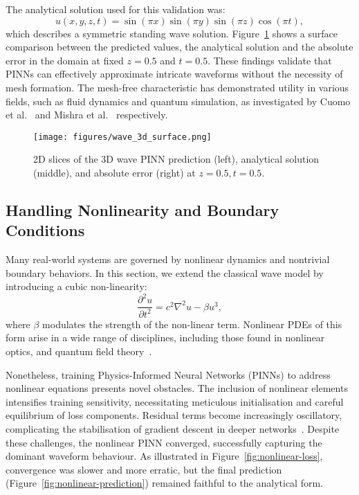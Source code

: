 \documentclass[12pt,a4paper]{article}
\begin{document}
The analytical solution used for this validation was:
\begin{equation}
u(x,y,z,t) = \sin(\pi x)\sin(\pi y)\sin(\pi z)\cos(\pi t),
\label{eq:wave-3d-analytic}
\end{equation}
which describes a symmetric standing wave solution. Figure~\ref{fig:wave3d-surfaces} shows a surface comparison between the predicted values, the analytical solution and the absolute error in the domain at fixed \(z = 0.5\) and \(t = 0.5\). These findings validate that PINNs can effectively approximate intricate waveforms without the necessity of mesh formation. The mesh-free characteristic has demonstrated utility in various fields, such as fluid dynamics and quantum simulation, as investigated by Cuomo et al.~\cite{cuomo2022scientific} and Mishra et al.~\cite{mishra2022estimates} respectively.

\begin{figure}[h!]
  \centering
  \texttt{[image: figures/wave\_3d\_surface.png]}
  \caption{2D slices of the 3D wave PINN prediction (left), analytical solution (middle), and absolute error (right) at \(z = 0.5, t = 0.5\).}
  \label{fig:wave3d-surfaces}
\end{figure}

\subsection{Handling Nonlinearity and Boundary Conditions}

Many real-world systems are governed by nonlinear dynamics and nontrivial boundary behaviors. In this section, we extend the classical wave model by introducing a cubic non-linearity:
\begin{equation}
\frac{\partial^2 u}{\partial t^2} = c^2 \nabla^2 u - \beta u^3,
\label{eq:nonlinear-wave}
\end{equation}
where \(\beta\) modulates the strength of the non-linear term. Nonlinear PDEs of this form arise in a wide range of disciplines, including those found in nonlinear optics, and quantum field theory~\cite{strauss2007partial, taylor2010partial}.

Nonetheless, training Physics-Informed Neural Networks (PINNs) to address nonlinear equations presents novel obstacles. The inclusion of nonlinear elements intensifies training sensitivity, necessitating meticulous initialisation and careful equilibrium of loss components. Residual terms become increasingly oscillatory, complicating the stabilisation of gradient descent in deeper networks~\cite{wang2022understanding}. Despite these challenges, the nonlinear PINN converged, successfully capturing the dominant waveform behaviour. As illustrated in Figure~\ref{fig:nonlinear-loss}, convergence was slower and more erratic, but the final prediction (Figure~\ref{fig:nonlinear-prediction}) remained faithful to the analytical form.
\end{document}
